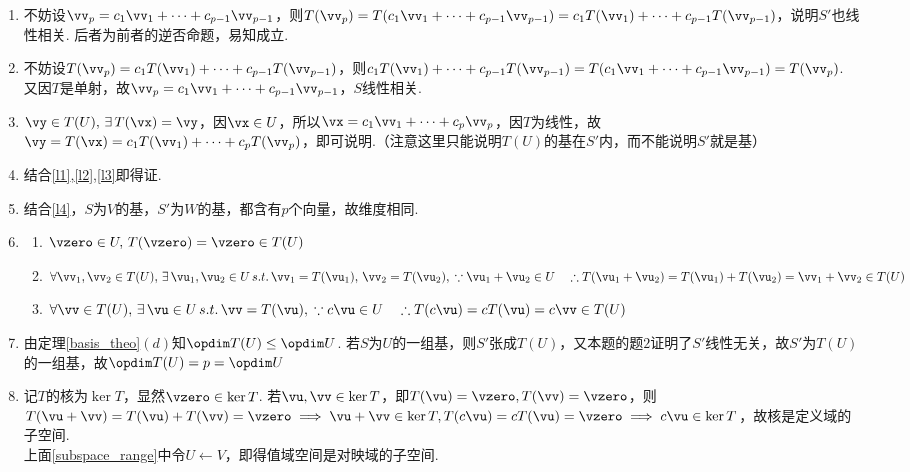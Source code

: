 \begin{analysis}
\begin{enumerate}
\item 不妨设$\vv_p=c_1\vv_1+\cdots+c_{p-1}\vv_{p-1}$，则$T(\vv_p)=T(c_1\vv_1+\cdots+c_{p-1}\vv_{p-1})=c_1T(\vv_1)+\cdots+c_{p-1}T(\vv_{p-1})$，说明$S'$也线性相关. 后者为前者的逆否命题，易知成立.
\item 不妨设$T(\vv_p)=c_1T(\vv_1)+\cdots+c_{p-1}T(\vv_{p-1})$，则$c_1T(\vv_1)+\cdots+c_{p-1}T(\vv_{p-1})=T(c_1\vv_1+\cdots+c_{p-1}\vv_{p-1})=T(\vv_p)$. 又因$T$是单射，故$\vv_p=c_1\vv_1+\cdots+c_{p-1}\vv_{p-1}$，$S$线性相关.
\item $\vy\in T(U),\,\exists\,T(\vx)=\vy$，因$\vx\in U$，所以$\vx=c_1\vv_1+\cdots+c_p\vv_p$，因$T$为线性，故$\vy=T(\vx)=c_1T(\vv_1)+\cdots+c_pT(\vv_p)$，即可说明.（注意这里只能说明$T(U)$的基在$S'$内，而不能说明$S'$就是基）
\item 结合\ref{l1},\ref{l2},\ref{l3}即得证.
\item 结合\ref{l4}，$S$为$V$的基，$S'$为$W$的基，都含有$p$个向量，故维度相同.
\item \begin{enumerate}
	\item $\vzero\in U,\,T(\vzero)=\vzero\in T(U)$
	\item $\forall\vv_1,\vv_2\in T(U),\,\exists\,\vu_1,\vu_2\in U\,s.t.\,\vv_1=T(\vu_1),\,\vv_2=T(\vu_2),\\
	\because \vu_1+\vu_2\in U\quad\therefore T(\vu_1+\vu_2)=T(\vu_1)+T(\vu_2)=\vv_1+\vv_2 \in T(U)$
	\item $\forall\vv\in T(U),\,\exists\,\vu\in U\,s.t.\,\vv=T(\vu),\\
	\because c\vu\in U\quad\therefore T(c\vu)=cT(\vu)=c\vv\in T(U)$
\end{enumerate}
\item 由定理\ref{basis_theo}$(d)$知$\opdim T(U)\leq\opdim U$. 若$S$为$U$的一组基，则$S'$张成$T(U)$，又本题的题$2$证明了$S'$线性无关，故$S'$为$T(U)$的一组基，故$\opdim T(U)=p=\opdim U$
\item 记$T$的核为$\ker T$，显然$\vzero\in\ker T$. 若$\vu,\vv\in \ker T$，即$T(\vu)=\vzero,T(\vv)=\vzero$，则$T(\vu+\vv)=T(\vu)+T(\vv)=\vzero\implies \vu+\vv\in \ker T,T(c\vu)=cT(\vu)=\vzero\implies c\vu\in\ker T$，故核是定义域的子空间.\\
上面\ref{subspace_range}中令$U\gets V$，即得值域空间是对映域的子空间.
\end{enumerate}
\end{analysis}

